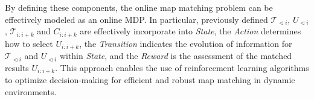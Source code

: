 By defining these components, the online map matching problem can be effectively modeled as an online MDP. In particular, previously defined $\mathcal{T}_{\vartriangleleft i}$, $U_{\vartriangleleft i}$, $\mathcal{T}_{i:i+k}$ and $C_{i:i+k}$ are effectively incorporate into \textit{State}, the \textit{Action} determines how to select $U_{i:i+k}$, the \textit{Transition} indicates the evolution of information for $\mathcal{T}_{\vartriangleleft i}$ and $U_{\vartriangleleft i}$ within \textit{State}, and the \textit{Reward} is the assessment of the matched results $U_{i:i+k}$. This approach enables the use of reinforcement learning algorithms to optimize decision-making for efficient and robust map matching in dynamic environments.



